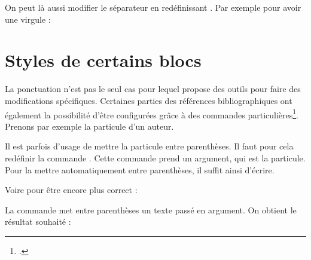 \bibverbose
\begin{quotation}
\cites{Saxer1980}{Junod1992}
\end{quotation}
\bibverbosetrad

On peut là aussi modifier le séparateur en redéfinissant . Par exemple pour avoir une virgule :

\begin{latexcode}
\renewcommand{\multicitedelim}[0]{\addcomma\addspace}
\end{latexcode}


\section{Styles de certains blocs}

La ponctuation n'est pas le seul cas pour lequel   propose des outils pour faire des modifications spécifiques. Certaines parties des références bibliographiques ont également  la possibilité d'être configurées grâce à des commandes particulières\footcite{biblatex_hooks}. Prenons par exemple la particule d'un auteur.
    
    \bibverbose
    \begin{quotation}
    \cite{BeauvoirSexe}
    \end{quotation}
    
    \renewcommand{\mkbibnameprefix}[1]{\parentext{#1}}


    
Il est parfois d'usage de mettre la particule entre parenthèses. Il faut pour cela redéfinir la commande . Cette commande prend un argument, qui est la particule. Pour la mettre automatiquement entre parenthèses, il suffit ainsi d'écrire.
    
    \begin{latexcode}
\renewcommand{\mkbibnameprefix}[1]{(#1)}
    \end{latexcode}

    
Voire pour être encore plus correct :
    
    \begin{latexcode}
\renewcommand{\mkbibnameprefix}[1]{\parentext{#1}}
    \end{latexcode}


La commande  met entre parenthèses un texte passé en argument. On obtient le résultat souhaité : 

    \begin{quotation}
    \cite{BeauvoirSexe}
    \end{quotation}
    
